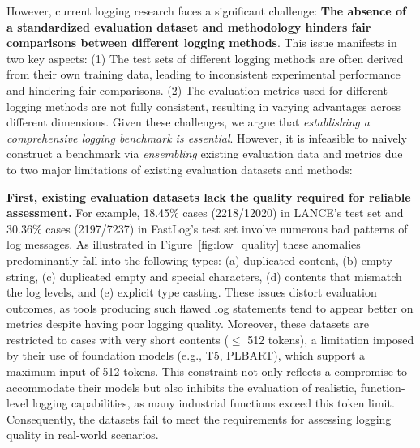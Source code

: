 However, current logging research faces a significant challenge: \textbf{The absence of a standardized evaluation dataset and methodology hinders fair comparisons between different logging methods}. This issue manifests in two key aspects:
(1) The test sets of different logging methods are often derived from their own training data, leading to inconsistent experimental performance and hindering fair comparisons.
(2) The evaluation metrics used for different logging methods are not fully consistent, resulting in varying advantages across different dimensions.
Given these challenges, we argue that \textit{establishing a comprehensive logging benchmark is essential}. However, it is infeasible to naively construct a benchmark via \textit{ensembling} existing evaluation data and metrics due to two major limitations of existing evaluation datasets and methods:


\textbf{First, existing evaluation datasets lack the quality required for reliable assessment.}
For example, 18.45\% cases (2218/12020) in LANCE's test set and 30.36\% cases (2197/7237) in FastLog's test set involve numerous bad patterns of log messages. 
As illustrated in Figure~\ref{fig:low_quality} these anomalies predominantly fall into the following types: (a) duplicated content, (b) empty string, (c) duplicated empty and special characters, (d) contents that mismatch the log levels, and (e) explicit type casting.
These issues distort evaluation outcomes, as tools producing such flawed log statements tend to appear better on metrics despite having poor logging quality.
Moreover, these datasets are restricted to cases with very short contents ($\leq$ 512 tokens), a limitation imposed by their use of foundation models (e.g., T5, PLBART), which support a maximum input of 512 tokens. This constraint not only reflects a compromise to accommodate their models but also inhibits the evaluation of realistic, function-level logging capabilities, as many industrial functions exceed this token limit. Consequently, the datasets fail to meet the requirements for assessing logging quality in real-world scenarios.

